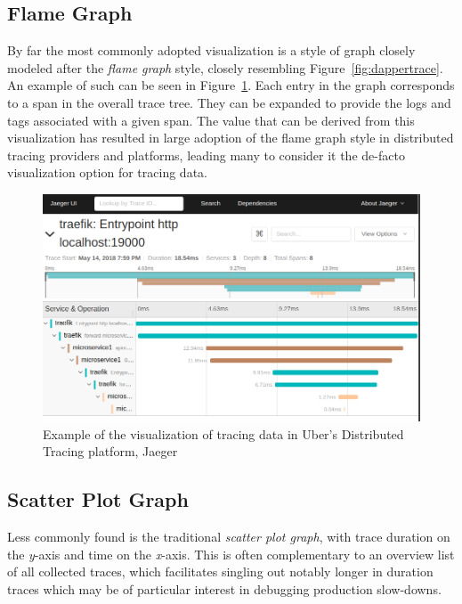 \documentclass[pdftex,titlepage]{article}
\begin{document}
        \subsection{Flame Graph}
        By far the most commonly adopted visualization 
        is a style of graph closely modeled after the \textit{flame graph} style, closely resembling Figure~\ref{fig:dappertrace}. An example 
        of such can be seen in Figure~\ref{fig:jaeger}. Each entry in the graph corresponds to a span in the overall trace tree. They can be
        expanded to provide the logs and tags associated with a given span. The value that can be derived from this visualization has resulted
        in large adoption of the flame graph style in distributed tracing providers and platforms, leading many to consider it the de-facto 
        visualization option for tracing data.

        \medskip

        \begin{figure}[htb!]
            \centering
            \includegraphics[scale=0.35]{jaeger}
            \caption{Example of the visualization of tracing data in Uber's Distributed Tracing platform, Jaeger}
            \label{fig:jaeger}
        \end{figure}

        \subsection{Scatter Plot Graph}
        Less commonly found is the traditional \textit{scatter plot graph}, with trace duration on the \textit{y}-axis
        and time on the \textit{x}-axis. This is often complementary to an overview list of all collected traces, which
        facilitates singling out notably longer in duration traces which may be of particular interest in debugging production
        slow-downs. 
\end{document}
